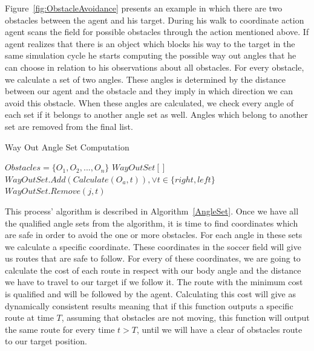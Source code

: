 Figure~\ref{fig:ObstacleAvoidance} presents an example in which there are two obstacles between the agent and his target. During his walk to coordinate action agent scans the field for possible obstacles through the action mentioned above. If agent realizes that there is an object which blocks his way to the target in the same simulation cycle he starts computing the possible way out angles that he can choose in relation to his observations about all obstacles. For every obstacle, we calculate a set of two angles. These angles is determined by the distance between our agent and the obstacle and they imply in which direction we can avoid this obstacle. When these angles are calculated, we check every angle of each set if it belongs to another angle set as well. Angles which belong to another set are removed from the final list.

\begin{algorithm}[ht!]
\caption{Way Out Angle Set Computation}
\label{AngleSet}
\begin{algorithmic}[1]
$Obstacles = \lbrace O_{1},O_{2},...,O_{n} \rbrace $
$WayOutSet[ ]$
\STATE $WayOutSet.Add(Calculate(O_{a},t)),\vee t \in \lbrace right,left \rbrace$
\ENDFOR
{}
\STATE $WayOutSet.Remove(j,t)$
\ENDIF
\ENDFOR
\ENDFOR
\end{algorithmic}
\end{algorithm}

This process' algorithm is described in Algorithm~\ref{AngleSet}. Once we have all the qualified angle sets from the algorithm, it is time to find coordinates which are safe in order to avoid the one or more obstacles. For each angle in these sets we calculate a specific coordinate. These coordinates in the soccer field will give us routes that are safe to follow. For every of these coordinates, we are going to calculate the cost of each route in respect with our body angle and the distance we have to travel to our target if we follow it. The route with the minimum cost is qualified and will be followed by the agent. Calculating this cost will give as dynamically consistent results meaning that if this function outputs a specific route at time $T$, assuming that obstacles are not moving, this function will output the same route for every time $t > T$, until we will have a clear of obstacles route to our target position.


